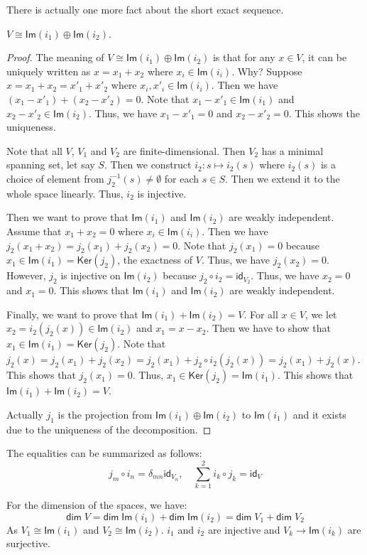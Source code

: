 \documentclass[
	11pt, %
	fleqn, %
	a4paper, %
]{LegrandOrangeBook}
\renewcommand{\ker}[1]{\mathsf{Ker}(#1)} %
\renewcommand{\Im}[1]{\mathsf{Im}(#1)} %
\newcommand{\id}{\mathsf{id}} %
\renewcommand{\dim}{\mathsf{dim\;}} %
\begin{document}
There is actually one more fact about the short exact sequence.
\begin{proposition}
    $V \cong \Im{i_1} \oplus \Im{i_2}$.
\end{proposition}
\begin{proof}
    The meaning of $V \cong \Im{i_1} \oplus \Im{i_2}$ is that for any $x \in V$, it can be uniquely written as $x = x_1 + x_2$ where $x_i \in \Im{i_i}$. Why? Suppose $x = x_1 + x_2 = x'_1 + x'_2$ where $x_i, x'_i \in \Im{i_i}$. Then we have $(x_1 - x'_1) + (x_2 - x'_2) = 0$. Note that $x_1 - x'_1 \in \Im{i_1}$ and $x_2 - x'_2 \in \Im{i_2}$. Thus, we have $x_1 - x'_1 = 0$ and $x_2 - x'_2 = 0$. This shows the uniqueness.

    Note that all $V$, $V_1$ and $V_2$ are finite-dimensional. Then $V_2$ has a minimal spanning set, let say $S$. Then we construct $i_2 : s \mapsto i_2(s)$ where $i_2(s)$ is a choice of element from $j_2^{-1}(s) \neq \emptyset$ for each $s \in S$. Then we extend it to the whole space linearly. Thus, $i_2$ is injective. 

    Then we want to prove that $\Im{i_1}$ and $\Im{i_2}$ are weakly independent. Assume that $x_1 + x_2 = 0$ where $x_i \in \Im{i_i}$. Then we have $j_2(x_1 + x_2) = j_2(x_1) + j_2(x_2) = 0$. Note that $j_2(x_1) = 0$ because $x_1 \in \Im{i_1} = \ker{j_2}$, the exactness of $V$. Thus, we have $j_2(x_2) = 0$. However, $j_2$ is injective on $\Im{i_2}$ because $j_2 \circ i_2 = \id_{V_2}$. Thus, we have $x_2 = 0$ and $x_1 = 0$. This shows that $\Im{i_1}$ and $\Im{i_2}$ are weakly independent.

    Finally, we want to prove that $\Im{i_1} + \Im{i_2} = V$. For all $x \in V$, we let $x_2 = i_2(j_2(x)) \in \Im{i_2}$ and $x_1 = x - x_2$. Then we have to show that $x_1 \in \Im{i_1} = \ker{j_2}$. Note that $j_2(x) = j_2(x_1) + j_2(x_2) = j_2(x_1) + j_2 \circ i_2(j_2(x)) = j_2(x_1) + j_2(x)$. This shows that $j_2(x_1) = 0$. Thus, $x_1 \in \ker{j_2} = \Im{i_1}$. This shows that $\Im{i_1} + \Im{i_2} = V$.

    Actually $j_1$ is the projection from $\Im{i_1} \oplus \Im{i_2}$ to $\Im{i_1}$ and it exists due to the uniqueness of the decomposition.
\end{proof}

The equalities can be summarized as follows:
\[
    j_m \circ i_n = \delta_{mn} \id_{V_n}, \quad \sum_{k=1}^{2} i_k \circ j_k = \id_V
\]

For the dimension of the spaces, we have:
\[
    \dim{V} = \dim{\Im{i_1}} + \dim{\Im{i_2}} = \dim{V_1} + \dim{V_2}
\]
As $V_1 \cong \Im{i_1}$ and $V_2 \cong \Im{i_2}$. $i_1$ and $i_2$ are injective and $V_k \to \Im{i_k}$ are surjective. 
\end{document}
